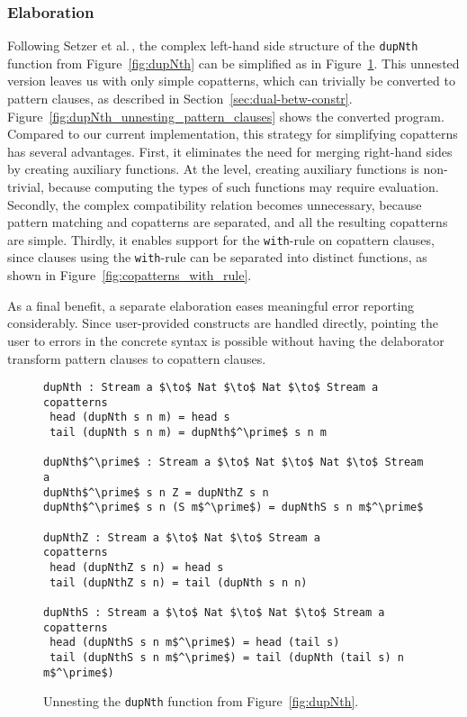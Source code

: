 \subsubsection{Elaboration}
Following Setzer et al.\,\citep{Setzer14Unnesting}, the
complex left-hand side structure of the \texttt{dupNth} function from
Figure~\ref{fig:dupNth} can be simplified as in
Figure~\ref{fig:dupNth_unnesting}. This unnested version leaves us with only
simple copatterns, which can trivially be converted to pattern clauses, as
described in Section~\ref{sec:dual-betw-constr}. Figure~\ref{fig:dupNth_unnesting_pattern_clauses} shows the converted
program. Compared to our current implementation, this strategy for simplifying
copatterns has several advantages. First, it eliminates the need for merging
right-hand sides by creating auxiliary functions. At the \IdrisM{} level,
creating auxiliary functions is non-trivial, because computing the types of such
functions may require evaluation. Secondly, the complex compatibility relation
becomes unnecessary, because pattern matching and copatterns are separated, and
all the resulting copatterns are simple. Thirdly, it enables support for the
\texttt{with}-rule on copattern clauses, since clauses using the
\texttt{with}-rule can be separated into distinct functions, as shown in
Figure~\ref{fig:copatterns_with_rule}.

As a final benefit, a separate elaboration eases meaningful error reporting
considerably. Since user-provided constructs are handled directly, pointing the
user to errors in the concrete syntax is possible without having the delaborator
transform pattern clauses to copattern clauses.

\begin{figure}
\begin{lstlisting}[mathescape]
dupNth : Stream a $\to$ Nat $\to$ Nat $\to$ Stream a
copatterns
 head (dupNth s n m) = head s
 tail (dupNth s n m) = dupNth$^\prime$ s n m

dupNth$^\prime$ : Stream a $\to$ Nat $\to$ Nat $\to$ Stream a
dupNth$^\prime$ s n Z = dupNthZ s n
dupNth$^\prime$ s n (S m$^\prime$) = dupNthS s n m$^\prime$

dupNthZ : Stream a $\to$ Nat $\to$ Stream a
copatterns
 head (dupNthZ s n) = head s
 tail (dupNthZ s n) = tail (dupNth s n n)

dupNthS : Stream a $\to$ Nat $\to$ Nat $\to$ Stream a
copatterns
 head (dupNthS s n m$^\prime$) = head (tail s)
 tail (dupNthS s n m$^\prime$) = tail (dupNth (tail s) n m$^\prime$)
\end{lstlisting}
  \caption{Unnesting the \texttt{dupNth} function from Figure~\ref{fig:dupNth}.}
  \label{fig:dupNth_unnesting}
\end{figure}

